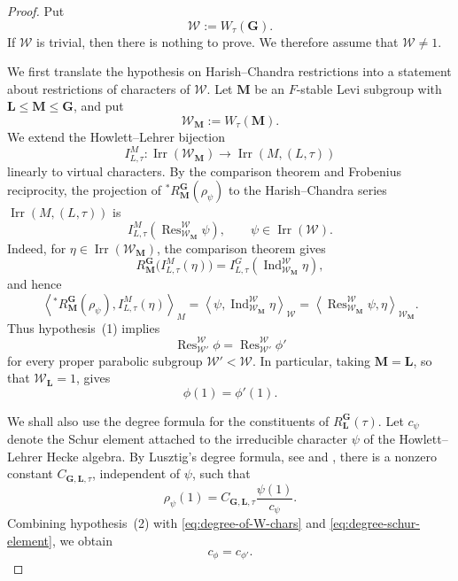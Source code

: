 \documentclass{amsart}
\theoremstyle{plain}
\numberwithin{equation}{section}
\theoremstyle{definition}
\newcommand{\Ind}{\operatorname{Ind}}
\newcommand{\Res}{\operatorname{Res}}
\newcommand{\Irr}{\operatorname{Irr}}
\newcommand{\cW}{\mathcal{W}}
\newcommand{\bG}{\mathbf{G}}
\newcommand{\bL}{\mathbf{L}}
\newcommand{\bM}{\mathbf{M}}
\begin{document}
\begin{proof}
Put
\[
\cW:=W_{\tau}(\bG).
\]
If $\cW$ is trivial, then there is nothing to prove. We therefore assume that
$\cW\neq 1$.

We first translate the hypothesis on Harish--Chandra restrictions into a
statement about restrictions of characters of $\cW$.  Let $\bM$ be an
$F$-stable Levi subgroup with $\bL\leq \bM\leq \bG$, and put
\[
\cW_{\bM}:=W_{\tau}(\bM).
\]
We extend the Howlett--Lehrer bijection
\[
I_{L,\tau}^{M}:\Irr(\cW_{\bM})\longrightarrow \Irr(M,(L,\tau))
\]
linearly to virtual characters.  By the comparison theorem and Frobenius
reciprocity, the projection of ${}^*R_{\bM}^{\bG}(\rho_{\psi})$ to the
Harish--Chandra series $\Irr(M,(L,\tau))$ is
\begin{equation}\label{eq:HC-restriction-W}
I_{L,\tau}^{M}\!\left(\Res_{\cW_{\bM}}^{\cW}\psi\right),
\qquad \psi\in \Irr(\cW).
\end{equation}
Indeed, for $\eta\in\Irr(\cW_{\bM})$, the comparison theorem gives
\[
R_{\bM}^{\bG}\bigl(I_{L,\tau}^{M}(\eta)\bigr)
=
I_{L,\tau}^{G}\!\left(\Ind_{\cW_{\bM}}^{\cW}\eta\right),
\]
and hence
\[
\left\langle {}^*R_{\bM}^{\bG}(\rho_\psi),
I_{L,\tau}^{M}(\eta)\right\rangle_M
=
\left\langle \psi,\Ind_{\cW_{\bM}}^{\cW}\eta\right\rangle_{\cW}
=
\left\langle \Res_{\cW_{\bM}}^{\cW}\psi,\eta\right\rangle_{\cW_{\bM}}.
\]
Thus hypothesis~\textup{(1)} implies
\begin{equation}\label{eq:proper-parabolic-restrictions}
\Res_{\cW'}^{\cW}\phi
=
\Res_{\cW'}^{\cW}\phi'
\end{equation}
for every proper parabolic subgroup $\cW'<\cW$.  In particular, taking
$\bM=\bL$, so that $\cW_{\bL}=1$, gives
\begin{equation}\label{eq:degree-of-W-chars}
\phi(1)=\phi'(1).
\end{equation}

We shall also use the degree formula for the constituents of
$R_{\bL}^{\bG}(\tau)$.  Let $c_{\psi}$ denote the Schur element attached to
the irreducible character $\psi$ of the Howlett--Lehrer Hecke algebra.  By
Lusztig's degree formula, see \cite[Cor.~8.7]{Lus84} and
\cite[\S8.1.8]{geck-pfeiffer:2000:characters-of-finite-coxeter-groups},
there is a nonzero constant $C_{\bG,\bL,\tau}$, independent of $\psi$, such
that
\begin{equation}\label{eq:degree-schur-element}
\rho_{\psi}(1)
=
C_{\bG,\bL,\tau}\frac{\psi(1)}{c_{\psi}}.
\end{equation}
Combining hypothesis~\textup{(2)} with \eqref{eq:degree-of-W-chars} and
\eqref{eq:degree-schur-element}, we obtain
\begin{equation}\label{eq:equal-schur-elements}
c_{\phi}=c_{\phi'}.
\end{equation}


\end{proof}
\end{document}

